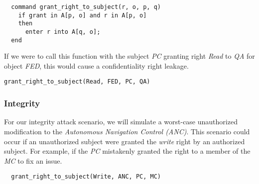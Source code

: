 \documentclass[10pt,journal,compsoc]{IEEEtran}
\begin{document}
  \begin{lstlisting}
  command grant_right_to_subject(r, o, p, q)
    if grant in A[p, o] and r in A[p, o]
    then
      enter r into A[q, o];
  end
  \end{lstlisting}
  
  If we were to call this function with the subject \textit{PC} granting right \textit{Read} to \textit{QA} for object \textit{FED}, this would cause a confidentiality right leakage. 

\begin{lstlisting}
grant_right_to_subject(Read, FED, PC, QA)
\end{lstlisting}

\subsubsection{Integrity}

For our integrity attack scenario, we will simulate a worst-case unauthorized modification to the \textit{Autonomous Navigation Control (ANC)}. This scenario could occur if an unauthorized subject were granted the \textit{write} right by an authorized subject. For example, if the \textit{PC} mistakenly granted the right to a member of the \textit{MC} to fix an issue.

\begin{lstlisting}
  grant_right_to_subject(Write, ANC, PC, MC)
\end{lstlisting}




\end{document}
